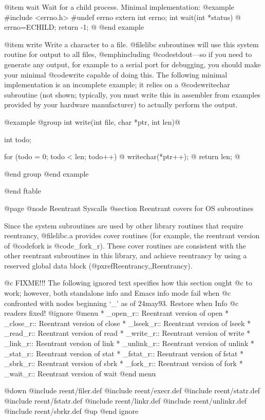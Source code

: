 @item wait
Wait for a child process.  Minimal implementation:
@example
#include <errno.h>
#undef errno
extern int errno;
int wait(int *status) @{
  errno=ECHILD;
  return -1;
@}
@end example

@item write
Write a character to a file.  @file{libc} subroutines will use this
system routine for output to all files, @emph{including}
@code{stdout}---so if you need to generate any output, for example to a
serial port for debugging, you should make your minimal @code{write}
capable of doing this.  The following minimal implementation is an
incomplete example; it relies on a @code{writechar} subroutine (not
shown; typically, you must write this in assembler from examples
provided by your hardware manufacturer) to actually perform the output.

@example
@group
int write(int file, char *ptr, int len)@{
    int todo;
  
    for (todo = 0; todo < len; todo++) @{
        writechar(*ptr++);
    @}
    return len;
@}
@end group
@end example

@end ftable

@page
@node Reentrant Syscalls
@section Reentrant covers for OS subroutines

Since the system subroutines are used by other library routines that
require reentrancy, @file{libc.a} provides cover routines (for example,
the reentrant version of @code{fork} is @code{_fork_r}).  These cover
routines are consistent with the other reentrant subroutines in this
library, and achieve reentrancy by using a reserved global data block
(@pxref{Reentrancy,,Reentrancy}).

@c FIXME!!! The following ignored text specifies how this section ought
@c to work;  however, both standalone info and Emacs info mode fail when
@c confronted with nodes beginning `_' as of 24may93.  Restore when Info
@c readers fixed!
@ignore
@menu
* _open_r::	Reentrant version of open
* _close_r::	Reentrant version of close
* _lseek_r::	Reentrant version of lseek
* _read_r::	Reentrant version of read
* _write_r::	Reentrant version of write
* _link_r::     Reentrant version of link
* _unlink_r::   Reentrant version of unlink
* _stat_r::     Reentrant version of stat
* _fstat_r::    Reentrant version of fstat
* _sbrk_r::     Reentrant version of sbrk
* _fork_r::	Reentrant version of fork
* _wait_r::	Reentrant version of wait
@end menu

@down
@include reent/filer.def
@include reent/execr.def
@include reent/statr.def
@include reent/fstatr.def
@include reent/linkr.def
@include reent/unlinkr.def
@include reent/sbrkr.def
@up
@end ignore


